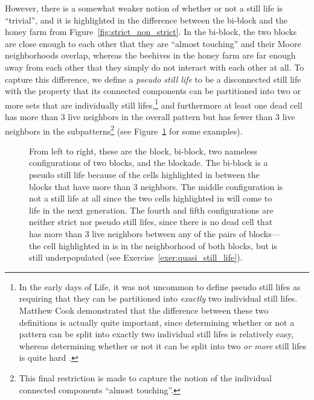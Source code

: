 However, there is a somewhat weaker notion of whether or not a still life is ``trivial'', and it is highlighted in the difference between the bi-block and the honey farm from Figure~\ref{fig:strict_non_strict}. In the bi-block, the two blocks are close enough to each other that they are ``almost touching'' and their Moore neighborhoods overlap, whereas the beehives in the honey farm are far enough away from each other that they simply do not interact with each other at all. To capture this difference, we define a \emph{pseudo still life} to be a disconnected still life with the property that its connected components can be partitioned into two or more sets that are individually still lifes,\footnote{In the early days of Life, it was not uncommon to define pseudo still lifes as requiring that they can be partitioned into \emph{exactly} two individual still lifes. Matthew Cook demonstrated that the difference between these two definitions is actually quite important, since determining whether or not a pattern can be split into exactly two individual still lifes is relatively easy, whereas determining whether or not it can be split into two \emph{or more} still lifes is quite hard \cite{Coo03}.} and furthermore at least one dead cell has more than $3$ live neighbors in the overall pattern but has fewer than $3$ live neighbors in the subpatterns\footnote{This final restriction is made to capture the notion of the individual connected components ``almost touching''.} (see Figure~\ref{fig:pseudo_not_pseudo} for some examples).

\begin{figure}[!htb]
	\centering{}
	\caption{From left to right, these are the block, bi-block, two nameless configurations of two blocks, and the blockade. The bi-block is a pseudo still life because of the cells highlighted in  between the blocks that have more than $3$ neighbors. The middle configuration is not a still life at all since the two cells highlighted in  will come to life in the next generation. The fourth and fifth configurations are neither strict nor pseudo still lifes, since there is no dead cell that has more than $3$ live neighbors between any of the pairs of blocks---the cell highlighted in  is in the neighborhood of both blocks, but is still underpopulated (see Exercise~\ref{exer:quasi_still_life}).}\label{fig:pseudo_not_pseudo}
\end{figure}

